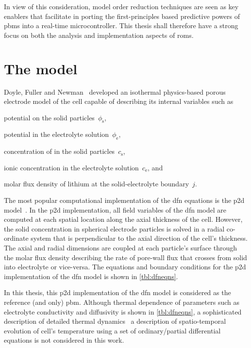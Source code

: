 In view of this consideration, model  order reduction techniques are seen as key
enablers that facilitate in porting the first-principles based predictive powers
of \glspl{pbm}  into a  real-time microcontroller.  This thesis  shall therefore
have  a  strong  focus  on  both the  analysis  and  implementation  aspects  of
\glspl{rom}.

\section{The  model}\label{sec:dfnmodel}

Doyle,  Fuller and  Newman~\cite{Doyle1993,Fuller1994}  developed an  isothermal
physics-based  porous electrode  model of  the  cell capable  of describing  its
internal variables such as
\begin{enumerate*}[label=\itshape\alph*\upshape)]
    \item potential on the solid particles~$\phi_\text{s}$,
    \item potential in the electrolyte solution~$\phi_\text{e}$,
    \item concentration of  in the solid particles~$c_\text{s}$,
    \item ionic concentration in the electrolyte solution~$c_\text{e}$, and
    \item molar flux density of lithium at the solid-electrolyte boundary~$j$.
\end{enumerate*}
The most popular computational implementation  of the \gls{dfn} equations is the
\gls{p2d}  model~\cite{Plett2015}. In  the \gls{p2d}  implementation, all  field
variables  of  the  \gls{dfn}  model  are  computed  at  each  spatial  location
along  the axial  thickness of  the cell.  However, the  solid concentration  in
spherical electrode particles  is solved in a radial co-ordinate  system that is
perpendicular to  the axial  direction of  the cell's  thickness. The  axial and
radial dimensions are coupled at each  particle's surface through the molar flux
density  describing the  rate of  pore-wall flux  that crosses  from solid  into
electrolyte  or  vice-versa.  The  equations and  boundary  conditions  for  the
\gls{p2d} implementation of the \gls{dfn} model is shown in \cref{tbl:dfneqns}.



In  this  thesis,  this  \gls{p2d}  implementation of  the  \gls{dfn}  model  is
considered as  the reference (and  only) \gls{pbm}. Although  thermal dependence
of  parameters  such  as  electrolyte  conductivity  and  diffusivity  is  shown
in \cref{tbl:dfneqns}, a sophisticated description  of detailed thermal dynamics
\ie~a description  of spatio-temporal evolution of cell's  temperature using a
set of ordinary/partial  differential equations is not considered  in this work.

